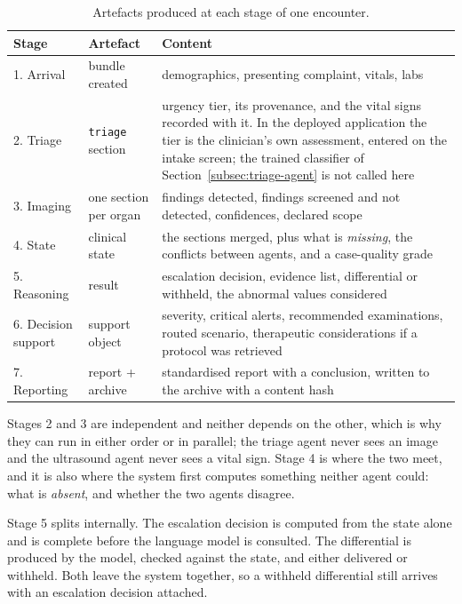 \begin{table}[H]
  \centering
  \small
  \caption{Artefacts produced at each stage of one encounter.}
  \label{tab:dataflow}
  \begin{tabularx}{\textwidth}{@{}llX@{}}
    \toprule
    Stage & Artefact & Content \\
    \midrule
    1. Arrival & bundle created & demographics, presenting complaint, vitals, labs \\
    2. Triage & \texttt{triage} section & urgency tier, its provenance, and the vital signs
      recorded with it. In the deployed application the tier is the clinician's own assessment,
      entered on the intake screen; the trained classifier of
      Section~\ref{subsec:triage-agent} is not called here \\
    3. Imaging & one section per organ & findings detected, findings screened and not detected,
      confidences, declared scope \\
    4. State & clinical state & the sections merged, plus what is \emph{missing}, the conflicts
      between agents, and a case-quality grade \\
    5. Reasoning & result & escalation decision, evidence list, differential or withheld, the
      abnormal values considered \\
    6. Decision support & support object & severity, critical alerts, recommended
      examinations, routed scenario, therapeutic considerations if a protocol was retrieved \\
    7. Reporting & report + archive & standardised report with a conclusion, written to the
      archive with a content hash \\
    \bottomrule
  \end{tabularx}
\end{table}

Stages 2 and 3 are independent and neither depends on the other, which is why they can run in
either order or in parallel; the triage agent never sees an image and the ultrasound agent
never sees a vital sign. Stage 4 is where the two meet, and it is also where the system first
computes something neither agent could: what is \emph{absent}, and whether the two agents
disagree.

Stage 5 splits internally. The escalation decision is computed from the state alone and is
complete before the language model is consulted. The differential is produced by the model,
checked against the state, and either delivered or withheld. Both leave the system together, so
a withheld differential still arrives with an escalation decision attached.

